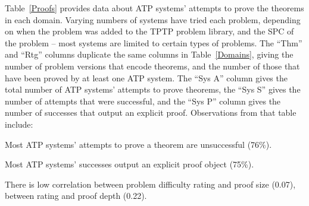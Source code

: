 \documentclass[runningheads]{llncs}
\newenvironment{packed_itemize}{
\vspace*{-0.2em}
\begin{itemize}
\setlength{\partopsep}{0pt}
\setlength{\itemsep}{1pt}
\setlength{\parskip}{0pt}
\setlength{\parsep}{0pt}
}{\end{itemize}}
\begin{document}
Table~\ref{Proofs} provides data about ATP systems' attempts to prove the theorems in each domain.
Varying numbers of systems have tried each problem, depending on when the problem was added to
the TPTP problem library, and the SPC of the problem -- most systems are limited to certain types
of problems.
The ``Thm'' and ``Rtg'' columns duplicate the same columns in Table~\ref{Domains}, giving the
number of problem versions that encode theorems, and the number of those that have been proved
by at least one ATP system.
The ``Sys A'' column gives the total number of ATP systems' attempts to prove theorems, the 
``Sys S'' gives the number of attempts that were successful, and the ``Sys P'' column gives the 
number of successes that output an explicit proof.
Observations from that table include:
\begin{packed_itemize}
\item Most ATP systems' attempts to prove a theorem are unsuccessful (76\%).
\item Most ATP systems' successes output an explicit proof object (75\%).
\item There is low correlation between problem difficulty rating and proof size (0.07),
      between rating and proof depth (0.22).
\end{packed_itemize}
\end{document}

